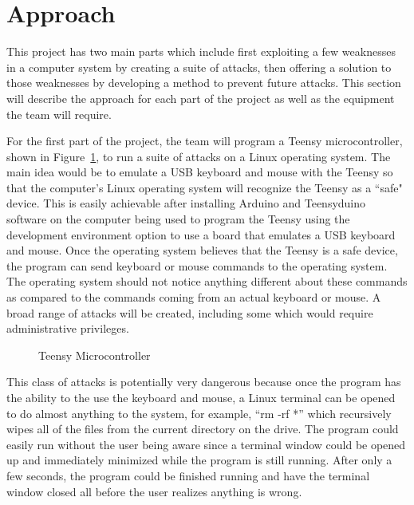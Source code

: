 \documentclass[pagenumbers]{ieee}
\begin{document}
\section{Approach}

This project has two main parts which include first exploiting a few weaknesses in a computer system by creating a suite of attacks, then offering a solution to those weaknesses by developing a method to prevent future attacks. This section will describe the approach for each part of the project as well as the equipment the team will require.

For the first part of the project, the team will program a Teensy microcontroller, shown in Figure~\ref{fig:Teensy}, to run a suite of attacks on a Linux operating system. The main idea would be to emulate a USB keyboard and mouse with the Teensy so that the computer's Linux operating system will recognize the Teensy as a ``safe" device. This is easily achievable after installing Arduino and Teensyduino software on the computer being used to program the Teensy using the development environment option to use a board that emulates a USB keyboard and mouse. Once the operating system believes that the Teensy is a safe device, the program can send keyboard or mouse commands to the operating system. The operating system should not notice anything different about these commands as compared to the commands coming from an actual keyboard or mouse. A broad range of attacks will be created, including some which would require administrative privileges.

\begin{figure}[H]
   \caption{Teensy Microcontroller}
   \label{fig:Teensy}
\end{figure}

This class of attacks is potentially very dangerous because once the program has the ability to the use the keyboard and mouse, a Linux terminal can be opened to do almost anything to the system, for example, ``rm -rf *'' which recursively wipes all of the files from the current directory on the drive. The program could easily run without the user being aware since a terminal window could be opened up and immediately minimized while the program is still running. After only a few seconds, the program could be finished running and have the terminal window closed all before the user realizes anything is wrong.
\end{document}
